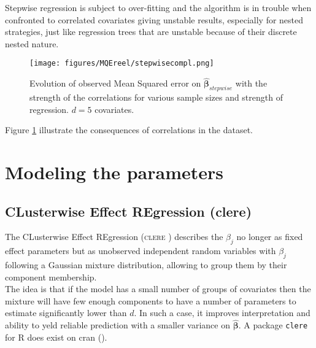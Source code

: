 \documentclass[12pt,a4paper]{report}
\begin{document}
		Stepwise regression is subject to over-fitting and the algorithm is in trouble when confronted to correlated covariates \cite{miller2002subset} giving unstable results, especially for nested strategies, just like regression trees that are unstable because of their discrete nested nature.
\begin{figure}
	 \centering
	  \texttt{[image: figures/MQEreel/stepwisecompl.png]}
	  \caption{Evolution of observed Mean Squared error on $\hat{\boldsymbol{\beta}}_{stepwise}$ with the strength of the correlations for various sample sizes and strength of regression. $d=5$ covariates. } \label{MQEstepwisecompl}
	\end{figure}
	Figure \ref{MQEstepwisecompl} illustrate the consequences of correlations in the dataset.
	
		\FloatBarrier

	\section{Modeling the parameters}			%

		\subsection{CLusterwise Effect REgression ({\sc clere})}		%

			The CLusterwise Effect REgression (\textsc{clere} \cite{yengo2012variable}) describes the $\beta_j$ no longer as fixed effect parameters but as unobserved independent random variables with $\beta_j$ following a Gaussian mixture distribution, allowing to group them by their component membership. \\
			
			 The idea is that if the model has a small number of groups of covariates then the mixture will have few enough components to have a number of parameters to estimate significantly lower than $d$. In such a case, it improves interpretation and ability to yeld reliable prediction with a smaller variance on $\boldsymbol{\hat{\beta}}$. A package {\tt clere} for R does exist on {\sc cran} (\cite{packageclere}).%
			 \\
			 
\end{document}
